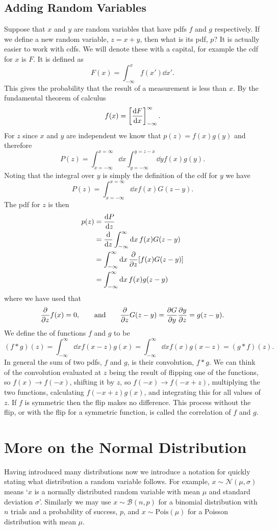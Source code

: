 \documentclass[a4paper]{article}
\newcommand{\convolution}{\mathbin{*}}
\newcommand{\distributed}{\sim}
\newcommand{\normal}{\mathcal{N}}
\newcommand{\binomial}{\mathcal{B}}
\newcommand{\poisson}{\mathrm{Pois}}
\begin{document}
    \subsection{Adding Random Variables}
    Suppose that \(x\) and \(y\) are random variables that have \glspl{pdf} \(f\) and \(g\) respectively.
    If we define a new random variable, \(z = x + y\), then what is its \gls{pdf}, \(p\)?
    It is actually easier to work with \glspl{cdf}.
    We will denote these with a capital, for example the \gls{cdf} for \(x\) is \(F\).
    It is defined as
    \[F(x) = \int_{-\infty}^{x} f(x')\dd{x'}.\]
    This gives the probability that the result of a measurement is less than \(x\).
    By the fundamental theorem of calculus
    \[f(x) = \left[\dv{F}{x}\right]_{-\infty}^{\infty}.\]
    For \(z\) since \(x\) and \(y\) are independent we know that \(p(z) = f(x)g(y)\) and therefore
    \[P(z) = \int_{x=-\infty}^{x=\infty}\dd{x} \int_{y=-\infty}^{y=z-x}\dd{y} f(x)g(y).\]
    Noting that the integral over \(y\) is simply the definition of the \gls{cdf} for \(y\) we have
    \[P(z) = \int_{x=-\infty}^{x=\infty} \dd{x} f(x)G(z - y).\]
    The \gls{pdf} for \(z\) is then
    \begin{align*}
        p(z) &= \dv{P}{z}\\
        &= \dv{z}\int_{-\infty}^{\infty} \dd{x} f(x)G(z - y)\\
        &= \int_{-\infty}^{\infty} \dd{x} \pdv{z}[f(x)G(z - y)]\\
        &= \int_{-\infty}^{\infty} \dd{x} f(x)g(z - y)
    \end{align*}
    where we have used that
    \[\pdv{z}f(x) = 0,\qquad\text{and}\qquad \pdv{z}G(z-y) = \pdv{G}{y}\pdv{y}{z} = g(z - y).\]
    We define the  of functions \(f\) and \(g\) to be
    \[(f\convolution g)(z) = \int_{-\infty}^{\infty} \dd{x} f(x - z)g(x) = \int_{-\infty}^{\infty} \dd{x} f(x)g(x - z) = (g\convolution f)(z).\]
    In general the sum of two \glspl{pdf}, \(f\) and \(g\), is their convolution, \(f\convolution g\).
    We can think of the convolution evaluated at \(z\) being the result of flipping one of the functions, so \(f(x)\to f(-x)\), shifting it by \(z\), so \(f(-x)\to f(-x + z)\), multiplying the two functions, calculating \(f(-x + z)g(x)\), and integrating this for all values of \(z\).
    If \(f\) is symmetric then the flip makes no difference.
    This process without the flip, or with the flip for a symmetric function, is called the correlation of \(f\) and \(g\).
    
    \section{More on the Normal Distribution}
    Having introduced many distributions now we introduce a notation for quickly stating what distribution a random variable follows.
    For example, \(x\distributed\normal(\mu, \sigma)\) means `\(x\) is a normally distributed random variable with mean \(\mu\) and standard deviation \(\sigma\)'.
    Similarly we may use \(x\distributed\binomial(n, p)\) for a binomial distribution with \(n\) trials and a probability of success, \(p\), and \(x\distributed\poisson(\mu)\) for a Poisson distribution with mean \(\mu\).
    
\end{document}
